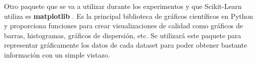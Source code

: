 Otro paquete que se va a utilizar durante los experimentos y que Scikit-Learn utiliza es \textbf{matplotlib} \citep{matplotlib}. Es la principal biblioteca de gráficos científicos en Python y proporciona funciones para crear visualizaciones de calidad como gráficos de barras, histogramas, gráficos de dispersión, etc. Se utilizará este paquete para representar gráficamente los datos de cada dataset para poder obtener bastante información con un simple vistazo. 





















